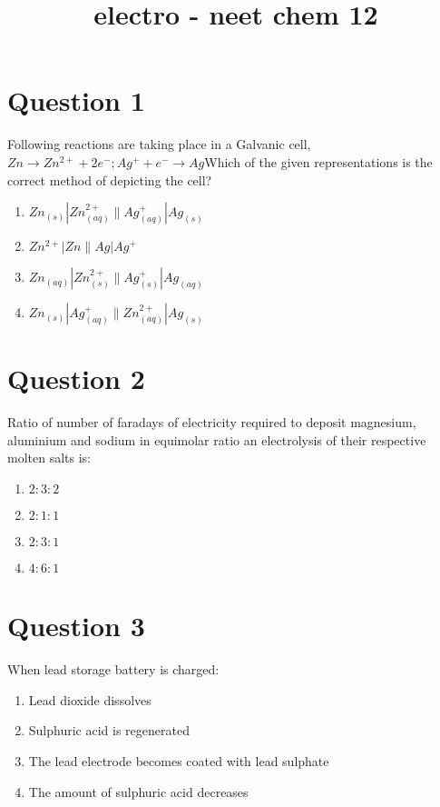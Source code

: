 \documentclass{article}
\title{electro - neet chem 12}
\begin{document}
                    \maketitle
                    \section*{Question 1}
Following reactions are taking place in a Galvanic cell,  \(Z n \rightarrow Z n^{2+}+2 e^{-} ; A g^{+}+e^{-} \rightarrow A g\)Which of the given representations is the correct method of depicting the cell?
\begin{enumerate}[label=(\alph*)]
\item \(Z n_{(s)}|Z n_{(a q)}^{2+} \| A g_{(a q)}^{+}| A g_{(s)}\)
\item \(Z n^{2+}|Z n \| A g| A g^{+}\)
\item \(Z n_{(a q)}|Z n_{(s)}^{2+} \| A g_{(s)}^{+}| A g_{(a q)}\)
\item \(Z n_{(s)}|A g_{(a q)}^{+} \| Z n_{(a q)}^{2+}| A g_{(s)}\)
\end{enumerate}
\newpage
\section*{Question 2}
Ratio of number of faradays of electricity required to deposit magnesium, aluminium and sodium in equimolar ratio an electrolysis of their respective molten salts is:
\begin{enumerate}[label=(\alph*)]
\item \(2: 3: 2\)
\item \(2: 1: 1\)
\item \(2: 3: 1\)
\item \(4: 6: 1\)
\end{enumerate}
\newpage
\section*{Question 3}
When lead storage battery is charged:
\begin{enumerate}[label=(\alph*)]
\item Lead dioxide dissolves
\item Sulphuric acid is regenerated
\item The lead electrode becomes coated with lead sulphate
\item The amount of sulphuric acid decreases
\end{enumerate}
\newpage
\end{document}
